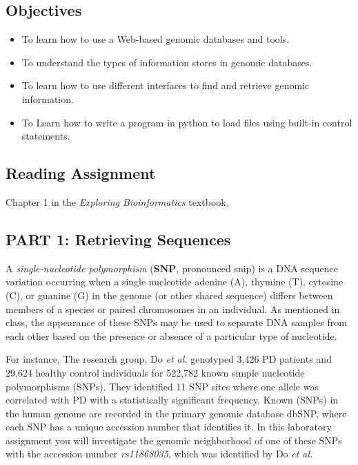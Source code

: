 

\long{}



\subsection*{Objectives}
\begin{itemize}
	\item To learn how to use a Web-based genomic databases and tools.
	\item To understand the types of information stores in genomic databases.
	\item To learn how to use different interfaces to find and retrieve genomic information. 
	\item To Learn how to write a program in python to load files using built-in control statements. 
\end{itemize}

\vspace*{-.1in}
\subsection*{Reading Assignment}
\vspace*{-.1in}
Chapter 1 in the \emph{Exploring Bioinformatics} textbook.

\vspace*{-.1in}
\subsection*{PART 1: Retrieving Sequences}
\vspace*{-.1in} 

A \emph{single-nucleotide polymorphism} (\textbf{SNP}, pronounced snip) is a DNA sequence variation occurring when a single nucleotide adenine (A), thymine (T), cytosine (C), or guanine (G) in the genome (or other shared sequence) differs between members of a species or paired chromosomes in an individual. As mentioned in class, the appearance of these SNPs may be used to separate DNA samples from each other based on the presence or absence of a particular type of nucleotide.

For instance, The research group, Do \emph{et al.} genotyped 3,426 PD patients and 29,624 healthy control individuals for 522,782 known simple nucleotide polymorphisms (SNPs). They identified 11 SNP sites where one allele was correlated with PD with a statistically significant frequency. Known (SNPs) in the human genome are recorded in the primary genomic database dbSNP, where each SNP has a unique accession number that identifies it. In this laboratory assignment you will investigate the genomic neighborhood of one of these SNPs with the accession number \emph{rs11868035}, which was identified by Do \emph{et al.} 

